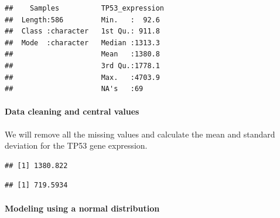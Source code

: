 \documentclass[
]{book}
\newenvironment{Shaded}{\begin{snugshade}}{\end{snugshade}}
\newcommand{\CommentTok}[1]{\textcolor[rgb]{0.56,0.35,0.01}{\textit{#1}}}
\newcommand{\FunctionTok}[1]{\textcolor[rgb]{0.13,0.29,0.53}{\textbf{#1}}}
\newcommand{\NormalTok}[1]{#1}
\newcommand{\OtherTok}[1]{\textcolor[rgb]{0.56,0.35,0.01}{#1}}
\newcommand{\SpecialCharTok}[1]{\textcolor[rgb]{0.81,0.36,0.00}{\textbf{#1}}}
\begin{document}
\begin{verbatim}
##    Samples          TP53_expression 
##  Length:586         Min.   :  92.6  
##  Class :character   1st Qu.: 911.8  
##  Mode  :character   Median :1313.3  
##                     Mean   :1380.8  
##                     3rd Qu.:1778.1  
##                     Max.   :4703.9  
##                     NA's   :69
\end{verbatim}

\hypertarget{data-cleaning-and-central-values}{%
\paragraph{Data cleaning and central values}\label{data-cleaning-and-central-values}}

We will remove all the missing values and calculate the mean and standard deviation for the TP53 gene expression.

\begin{Shaded}
\end{Shaded}

\begin{verbatim}
## [1] 1380.822
\end{verbatim}

\begin{Shaded}
\end{Shaded}

\begin{verbatim}
## [1] 719.5934
\end{verbatim}

\hypertarget{modeling-using-a-normal-distribution}{%
\paragraph{Modeling using a normal distribution}\label{modeling-using-a-normal-distribution}}
\end{document}
